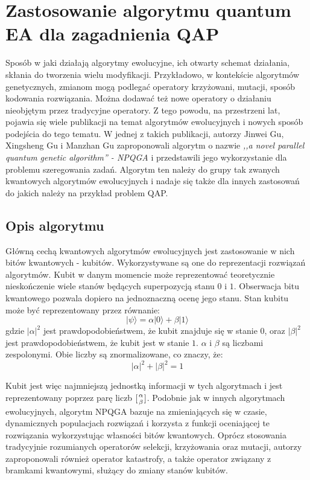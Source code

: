 \chapter{Zastosowanie algorytmu quantum EA dla zagadnienia QAP}
\label{cha:qap_ea}
Sposób w jaki działają algorytmy ewolucyjne, ich otwarty schemat działania, skłania do tworzenia wielu modyfikacji. Przykładowo, w kontekście algorytmów genetycznych, zmianom mogą podlegać operatory krzyżowani, mutacji, sposób kodowania rozwiązania. Można dodawać też nowe operatory o działaniu nieobjętym przez tradycyjne operatory. Z tego powodu, na przestrzeni lat, pojawia się wiele publikacji na temat algorytmów ewolucyjnych i nowych sposób podejścia do tego tematu. W jednej z takich publikacji, autorzy Jinwei Gu, Xingsheng Gu i Manzhan Gu zaproponowali algorytm o nazwie \textit{,,a novel parallel quantum genetic algorithm'' - NPQGA} i przedstawili jego wykorzystanie dla problemu szeregowania zadań.  Algorytm ten należy do grupy tak zwanych kwantowych algorytmów ewolucyjnych i nadaje się także dla innych zastosowań do jakich należy na przykład problem QAP.

\section{Opis algorytmu}
Główną cechą kwantowych algorytmów ewolucyjnych jest zastosowanie w nich bitów kwantowych - kubitów. Wykorzystywane są one do reprezentacji rozwiązań algorytmów. Kubit w danym momencie może reprezentować teoretycznie nieskończenie wiele stanów będących superpozycją stanu $0$ i $1$. Obserwacja bitu kwantowego pozwala dopiero na jednoznaczną ocenę jego stanu. Stan kubitu może być reprezentowany przez równanie:
\newline
\begin{equation}
|\psi\rangle=\alpha|0\rangle+\beta|1\rangle
\end{equation}
\newline
gdzie $|\alpha|^2$ jest prawdopodobieństwem, że kubit znajduje się w stanie $0$, oraz $|\beta|^2$ jest prawdopodobieństwem, że kubit jest w stanie $1$. $\alpha$ i $\beta$ są liczbami zespolonymi. Obie liczby są znormalizowane, co znaczy, że:
\newline
\begin{equation}
|\alpha|^2+|\beta|^2=1
\end{equation}
\newline 

Kubit jest więc najmniejszą jednostką informacji w tych algorytmach i jest reprezentowany poprzez parę liczb $[{\alpha \atop \beta}]$. Podobnie jak w innych algorytmach ewolucyjnych, algorytm NPQGA bazuje na zmieniających się w czasie, dynamicznych populacjach rozwiązań i korzysta z funkcji oceniającej te rozwiązania wykorzystując własności bitów kwantowych. Oprócz stosowania tradycyjnie rozumianych operatorów selekcji, krzyżowania oraz mutacji, autorzy zaproponowali również operator katastrofy, a także operator związany z bramkami kwantowymi, służący do zmiany stanów kubitów.

